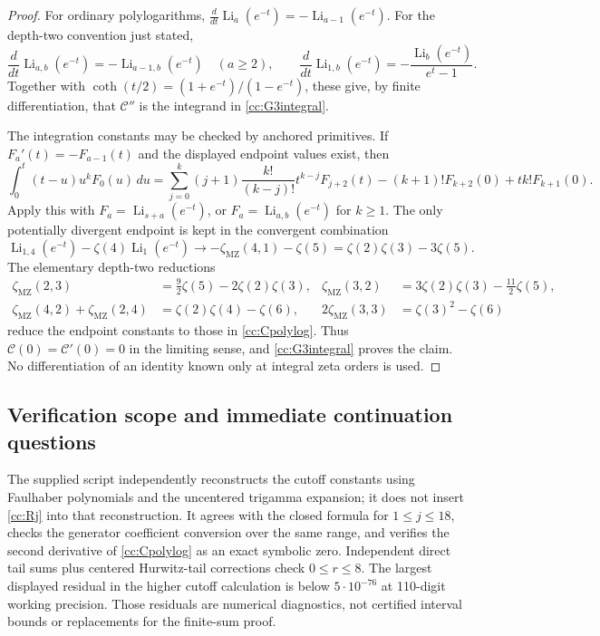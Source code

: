 \documentclass[11pt,letterpaper]{article}
\theoremstyle{definition}
\theoremstyle{remark}
\numberwithin{equation}{section}
\begin{document}
\begin{proof}
For ordinary polylogarithms,
$\frac{d}{dt}\operatorname{Li}_a(e^{-t})=-\operatorname{Li}_{a-1}(e^{-t})$.
For the depth-two convention just stated,
\[
 \frac{d}{dt}\operatorname{Li}_{a,b}(e^{-t})
   =-\operatorname{Li}_{a-1,b}(e^{-t})\quad(a\ge2),\qquad
 \frac{d}{dt}\operatorname{Li}_{1,b}(e^{-t})
   =-\frac{\operatorname{Li}_b(e^{-t})}{e^t-1}.
\]
Together with $\coth(t/2)=(1+e^{-t})/(1-e^{-t})$, these give,
by finite differentiation, that $\mathcal C''$ is the integrand in
\eqref{cc:G3integral}.

The integration constants may be checked by anchored primitives.
If $F_a'(t)=-F_{a-1}(t)$ and the displayed endpoint values exist, then
\begin{equation}\label{cc:anchoredprimitive}
 \int_0^t(t-u)u^kF_0(u)\,du
 =\sum_{j=0}^k(j+1)\frac{k!}{(k-j)!}t^{k-j}F_{j+2}(t)
       -(k+1)!F_{k+2}(0)+tk!F_{k+1}(0).
\end{equation}
Apply this with $F_a=\operatorname{Li}_{s+a}(e^{-t})$, or
$F_a=\operatorname{Li}_{a,b}(e^{-t})$ for $k\ge1$.
The only potentially divergent endpoint is kept in the convergent
combination
\[
 \operatorname{Li}_{1,4}(e^{-t})-\zeta(4)\operatorname{Li}_1(e^{-t})
 \longrightarrow -\zeta_{\mathrm{MZ}}(4,1)-\zeta(5)
                 =\zeta(2)\zeta(3)-3\zeta(5).
\]
The elementary depth-two reductions
\begin{align*}
 \zeta_{\mathrm{MZ}}(2,3)&=\tfrac92\zeta(5)-2\zeta(2)\zeta(3),&
 \zeta_{\mathrm{MZ}}(3,2)&=3\zeta(2)\zeta(3)-\tfrac{11}{2}\zeta(5),\\
 \zeta_{\mathrm{MZ}}(4,2)+\zeta_{\mathrm{MZ}}(2,4)&=\zeta(2)\zeta(4)-\zeta(6),&
 2\zeta_{\mathrm{MZ}}(3,3)&=\zeta(3)^2-\zeta(6)
\end{align*}
reduce the endpoint constants to those in \eqref{cc:Cpolylog}.
Thus $\mathcal C(0)=\mathcal C'(0)=0$ in the limiting sense,
and \eqref{cc:G3integral} proves the claim.  No differentiation of
an identity known only at integral zeta orders is used.
\end{proof}

\subsection{Verification scope and immediate continuation questions}

The supplied script independently reconstructs the cutoff constants
using Faulhaber polynomials and the uncentered trigamma expansion; it
does not insert \eqref{cc:Rj} into that reconstruction.  It agrees
with the closed formula for $1\le j\le18$, checks the generator
coefficient conversion over the same range, and verifies the second
derivative of \eqref{cc:Cpolylog} as an exact symbolic zero.
Independent direct tail sums plus centered Hurwitz-tail corrections
check $0\le r\le8$.  The largest displayed residual in the higher
cutoff calculation is below $5\cdot10^{-76}$ at 110-digit working
precision.  Those residuals are numerical diagnostics, not certified
interval bounds or replacements for the finite-sum proof.
\end{document}
